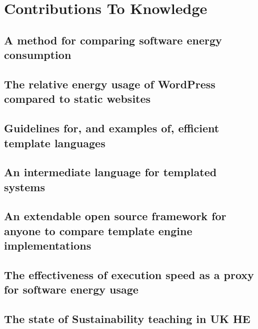 \section{Contributions To Knowledge}
\label{section:contributions}


\subsection{A method for comparing software energy consumption}
\subsection{The relative energy usage of WordPress compared to static websites}
\subsection{Guidelines for, and examples of, efficient template languages}
\subsection{An intermediate language for templated systems}
\subsection{An extendable open source framework for anyone to compare template engine implementations}
\subsection{The effectiveness of execution speed as a proxy for software energy usage}
\subsection{The state of Sustainability teaching in UK HE}